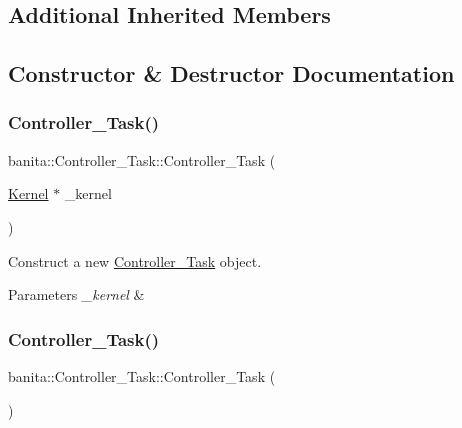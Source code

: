 \subsection*{Additional Inherited Members}


\subsection{Constructor \& Destructor Documentation}
\mbox{\label{classbanita_1_1_controller___task_a48c10c36d2112473685b6713ae65f26d}} 
\subsubsection{\texorpdfstring{Controller\_Task()}{Controller\_Task()}\hspace{0.1cm}{\footnotesize\ttfamily [1/2]}}
{\footnotesize\ttfamily banita\+::\+Controller\+\_\+\+Task\+::\+Controller\+\_\+\+Task (\begin{DoxyParamCaption}\item[{\mbox{\hyperlink{classbanita_1_1_kernel}{Kernel}} $\ast$}]{\+\_\+kernel }\end{DoxyParamCaption})\hspace{0.3cm}{\ttfamily [inline]}}



Construct a new \mbox{\hyperlink{classbanita_1_1_controller___task}{Controller\+\_\+\+Task}} object. 


\begin{DoxyParams}{Parameters}
{\em \+\_\+kernel} & \\
\hline
\end{DoxyParams}
\mbox{\label{classbanita_1_1_controller___task_a73f0bda0ad130e8449fe0c4c3d58a31b}} 
\subsubsection{\texorpdfstring{Controller\_Task()}{Controller\_Task()}\hspace{0.1cm}{\footnotesize\ttfamily [2/2]}}
{\footnotesize\ttfamily banita\+::\+Controller\+\_\+\+Task\+::\+Controller\+\_\+\+Task (\begin{DoxyParamCaption}{ }\end{DoxyParamCaption})\hspace{0.3cm}{\ttfamily [inline]}}



